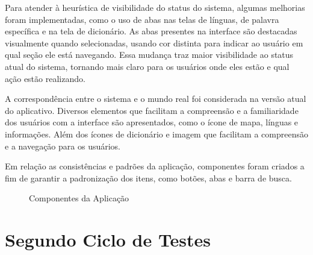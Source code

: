 Para atender à heurística de visibilidade do status do sistema, algumas melhorias foram implementadas, como o uso de abas nas telas de línguas, de palavra específica e na tela de dicionário.
As abas presentes na interface são destacadas visualmente quando selecionadas, usando cor distinta para indicar ao usuário em qual seção ele está navegando. Essa mudança traz maior visibilidade 
ao status atual do sistema, tornando mais claro para os usuários onde eles estão e qual ação estão realizando.

A correspondência entre o sistema e o mundo real foi considerada na versão atual do aplicativo. Diversos elementos que facilitam a compreensão e a familiaridade dos usuários com a interface são apresentados, 
como o ícone de mapa, línguas e informações. Além dos ícones de dicionário e imagem que facilitam a compreensão e a navegação para os usuários. 

Em relação as consistências e padrões da aplicação, componentes foram criados a fim de garantir a padronização dos itens, como botões, abas e barra de busca.

\begin{figure}[h!]
	\centering
	\caption{Componentes da Aplicação}
	\label{fig25}
\end{figure}

\section{Segundo Ciclo de Testes}
\label{sec:Segundo Ciclo}
